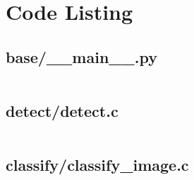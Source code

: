 \chapter{Code Listing}

\section{base/\_\_main\_\_.py}
\inputminted[linenos]{python}{../base/__main__.py}

\section{detect/detect.c}
\inputminted[linenos]{C}{../detect/detect.c}

\section{classify/classify\_image.c}
\inputminted[linenos]{python}{../classify/classify_image.py}
